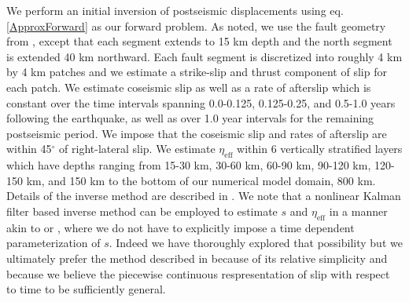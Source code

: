 \documentclass[12pt]{article}
\begin{document}
We perform an initial inversion of postseismic displacements using eq. \ref{ApproxForward} as our forward problem. As noted, we use the fault geometry from \cite{Wei2011}, except that each segment extends to 15 km depth and the north segment is extended 40 km northward.  Each fault segment is discretized into roughly 4 km by 4 km patches and we estimate a strike-slip and thrust component of slip for each patch. We estimate coseismic slip as well as a rate of afterslip which is constant over the time intervals spanning 0.0-0.125, 0.125-0.25, and 0.5-1.0 years following the earthquake, as well as over 1.0 year intervals for the remaining postseismic period.  We impose that the coseismic slip and rates of afterslip are within 45$^\circ$ of right-lateral slip.  We estimate $\eta_{\mathrm{eff}}$ within 6 vertically stratified layers which have depths ranging from 15-30 km, 30-60 km, 60-90 km, 90-120 km, 120-150 km, and 150 km to the bottom of our numerical model domain, 800 km. Details of the inverse method are described in \cite{Hines2015}.  We note that a nonlinear Kalman filter based inverse method can be employed to estimate $s$ and $\eta_{\mathrm{eff}}$ in a manner akin to \cite{Segall1997} or \cite{McGuire2003}, where we do not have to explicitly impose a time dependent parameterization of $s$. Indeed we have thoroughly explored that possibility but we ultimately prefer the method described in \cite{Hines2015} because of its relative simplicity and because we believe the piecewise continuous respresentation of slip with respect to time to be sufficiently general.
\end{document}
